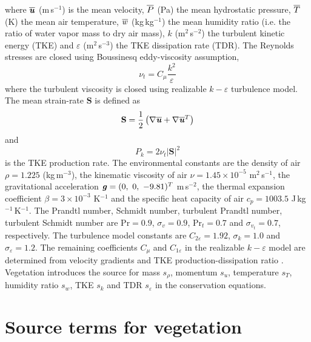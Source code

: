 where $\overline{\textbf{\textit{u}}}$ (m\,s$^{-1}$) is the mean velocity, $\overline{P}$ (Pa) the mean hydrostatic pressure, $\overline{T}$ (K) the mean air temperature, $\overline{w}$ (kg\,kg$^{-1}$) the mean humidity ratio (i.e. the ratio of water vapor mass to dry air mass), $k$ (m$^2$\,s$^{-2}$) the turbulent kinetic energy (TKE) and $\varepsilon$ (m$^2$\,s$^{-3}$) the TKE dissipation rate (TDR). The Reynolds stresses are closed using Boussinesq eddy-viscosity assumption, 
\begin{equation}
\nu_t = C_\mu \frac{k^2}{\varepsilon}
\end{equation}
where the turbulent viscosity is closed using realizable $k-\varepsilon$ turbulence model. The mean strain-rate $\mathbf{S}$ is defined as
\begin{equation}
\mathbf{S} = \frac{1}{2} \left( \nabla \overline{\textbf{\textit{u}}} +  \nabla \overline{\textbf{\textit{u}}}^T \right)
\end{equation}
and 
\begin{equation}
P_k = 2\nu_t |\mathbf{S}|^2
\end{equation}
is the TKE production rate. The environmental constants are the density of air $\rho=1.225$ (kg\,m$^{-3}$), the kinematic viscosity of air $\nu=1.45\times10^{-5}$ m$^2$\,s$^{-1}$, the gravitational acceleration $\mvec{g}= (0,\ 0,\ -9.81)^T$  m\,s$^{-2}$, the thermal expansion coefficient $\beta=3\times10^{-3}$ K$^{-1}$ and the specific heat capacity of air $c_p=1003.5$ J\,kg$^{-1}$\,K$^{-1}$. The Prandtl number, Schmidt number, turbulent Prandtl number, turbulent Schmidt number are $\mathrm{Pr}=0.9$, $\sigma_v=0.9$, $\mathrm{Pr}_t=0.7$ and $\sigma_{v_t}=0.7$, respectively. The turbulence model constants are $C_{2\varepsilon}=1.92$, $\sigma_k=1.0$ and $\sigma_{\varepsilon}=1.2$. The remaining coefficients $C_{\mu}$ and $C_{1\varepsilon}$ in the realizable $k-\varepsilon$ model are determined from velocity gradients and TKE production-dissipation ratio \citep{Shih1995}. Vegetation introduces the source for mass $s_{\rho}$, momentum $s_u$, temperature $s_T$, humidity ratio $s_w$, TKE $s_k$ and TDR $s_{\varepsilon}$ in the conservation equations.

\section{Source terms for vegetation}
\label{sec:sourceterms}

